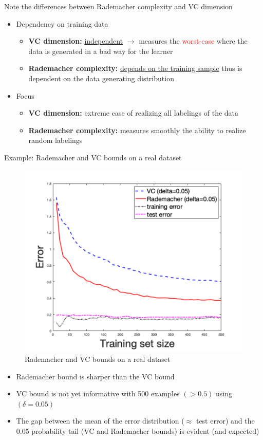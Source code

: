 \documentclass[12pt, a4paper]{article}
\begin{document}
Note the differences between Rademacher complexity and VC dimension

\begin{itemize}
  \item Dependency on training data
  \begin{itemize}
    \item \textbf{VC dimension:} \uline{independent} $\rightarrow$ measures the \textcolor{Red}{worst-case} where the data is generated in a bad way for the learner
    \item \textbf{Rademacher complexity:} \uline{depends on the training sample} thus is dependent on the data generating distribution
  \end{itemize}
  \item Focus
  \begin{itemize}
    \item \textbf{VC dimension:} extreme case of realizing all labelings of the data
    \item \textbf{Rademacher complexity:} measures smoothly the ability to realize random labelings
  \end{itemize}
\end{itemize}


\bigskip \bigskip


Example: Rademacher and VC bounds on a real dataset


\begin{figure}[H]
  \centering  %
    \includegraphics[width=0.7\columnwidth]{images/rademacher-vs-vc.png}
    \caption{Rademacher and VC bounds on a real dataset}
    \label{fig:fig6}
\end{figure}

\begin{itemize}
  \item Rademacher bound is sharper than the VC bound
  \item VC bound is not yet informative with 500 examples $(> 0.5)$ using $(\delta = 0.05)$
  \item The gap between the mean of the error distribution ($\approx$ test error) and the 0.05 probability tail (VC and Rademacher bounds) is evident (and expected)
\end{itemize}
\end{document}
